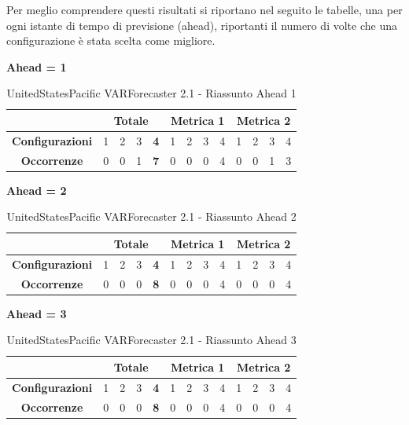 \documentclass[12pt,a4paper,oneside,openright]{book}
\begin{document}
Per meglio comprendere questi risultati si riportano nel seguito le tabelle, una per ogni istante di tempo di previsione (ahead), riportanti il numero di volte che una configurazione è stata scelta come migliore.

\medskip
\textbf{Ahead = 1}


\begin{table}[H]
\centering
\begin{tabular}{|c|c|c|c|c|c|c|c|c|c|c|c|c|}
\hline
 & \multicolumn{4}{|c|}{\textbf{Totale}} & \multicolumn{4}{|c|}{\textbf{Metrica 1}} & \multicolumn{4}{|c|}{\textbf{Metrica 2}} \\
\hline
\textbf{Configurazioni} & 1 & 2 & 3 & \textbf{4} & 1 & 2 & 3 & 4 & 1 & 2 & 3 & 4 \\
\hline
\textbf{Occorrenze} & 0 & 0 & 1 & \textbf{7} & 0 & 0 & 0 & 4 & 0 & 0 & 1 & 3\\
\hline
\end{tabular}
\caption{UnitedStatesPacific VARForecaster 2.1 - Riassunto Ahead 1}
\end{table}

\medskip
\textbf{Ahead = 2}


\begin{table}[H]
\centering
\begin{tabular}{|c|c|c|c|c|c|c|c|c|c|c|c|c|}
\hline
 & \multicolumn{4}{|c|}{\textbf{Totale}} & \multicolumn{4}{|c|}{\textbf{Metrica 1}} & \multicolumn{4}{|c|}{\textbf{Metrica 2}} \\
\hline
\textbf{Configurazioni} & 1 & 2 & 3 & \textbf{4} & 1 & 2 & 3 & 4 & 1 & 2 & 3 & 4 \\
\hline
\textbf{Occorrenze} & 0 & 0 & 0 & \textbf{8} & 0 & 0 & 0 & 4 & 0 & 0 & 0 & 4\\
\hline
\end{tabular}
\caption{UnitedStatesPacific VARForecaster 2.1 - Riassunto Ahead 2}
\end{table}

\medskip
\textbf{Ahead = 3}


\begin{table}[H]
\centering
\begin{tabular}{|c|c|c|c|c|c|c|c|c|c|c|c|c|}
\hline
 & \multicolumn{4}{|c|}{\textbf{Totale}} & \multicolumn{4}{|c|}{\textbf{Metrica 1}} & \multicolumn{4}{|c|}{\textbf{Metrica 2}} \\
\hline
\textbf{Configurazioni} & 1 & 2 & 3 & \textbf{4} & 1 & 2 & 3 & 4 & 1 & 2 & 3 & 4 \\
\hline
\textbf{Occorrenze} & 0 & 0 & 0 & \textbf{8} & 0 & 0 & 0 & 4 & 0 & 0 & 0 & 4\\
\hline
\end{tabular}
\caption{UnitedStatesPacific VARForecaster 2.1 - Riassunto Ahead 3}
\end{table}
\end{document}
